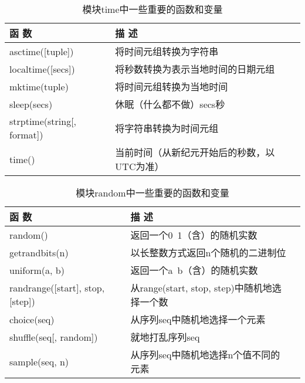 \begin{table}
    \centering
    \caption{模块time中一些重要的函数和变量}
    \label{time}
    \begin{tabular}{lll}
        \hline
        函 数                        & 描 述                     \\
        \hline
        asctime([tuple])           & 将时间元组转换为字符串             \\
        localtime([secs])          & 将秒数转换为表示当地时间的日期元组       \\
        mktime(tuple)              & 将时间元组转换为当地时间            \\
        sleep(secs)                & 休眠（什么都不做）secs秒          \\
        strptime(string[, format]) & 将字符串转换为时间元组             \\
        time()                     & 当前时间（从新纪元开始后的秒数，以UTC为准） \\
        \hline
    \end{tabular}
\end{table}

\begin{table}
    \centering
    \caption{模块random中一些重要的函数和变量}
    \label{random}
    \begin{tabular}{lll}
        \hline
        函 数                              & 描 述                                \\
        \hline
        random()                         & 返回一个0~1（含）的随机实数                    \\
        getrandbits(n)                   & 以长整数方式返回n个随机的二进制位                  \\
        uniform(a, b)                    & 返回一个a~b（含）的随机实数                    \\
        randrange([start], stop, [step]) & 从range(start, stop, step)中随机地选择一个数 \\
        choice(seq)                      & 从序列seq中随机地选择一个元素                   \\
        shuffle(seq[, random])           & 就地打乱序列seq                          \\
        sample(seq, n)                   & 从序列seq中随机地选择n个值不同的元素               \\
        \hline
    \end{tabular}
\end{table}